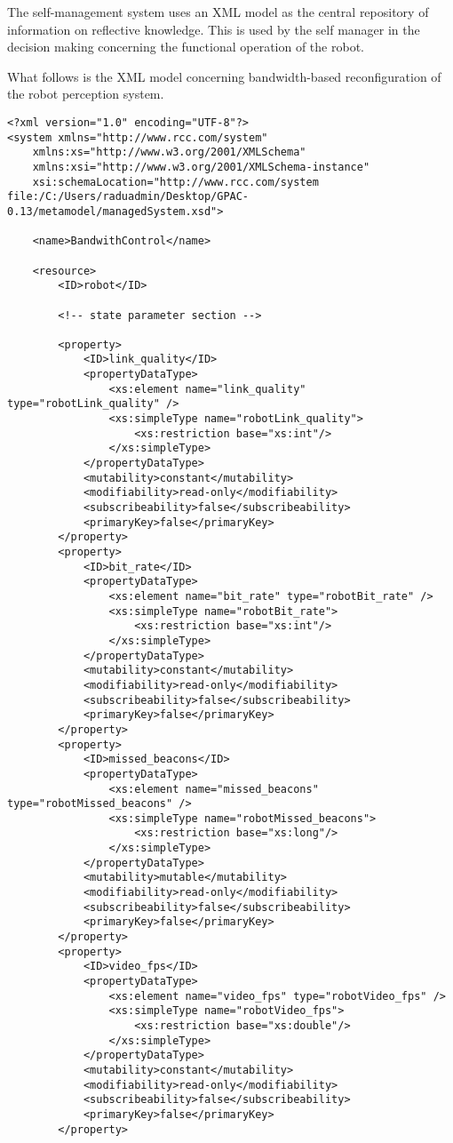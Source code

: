 \documentclass{aslreport}
\begin{document}
The self-management system uses an XML model as the central repository of information on reflective knowledge. This is used by the self manager in the decision making concerning the functional operation of the robot.

What follows is the XML model concerning bandwidth-based reconfiguration of the robot perception system.

{\small
\begin{verbatim}
<?xml version="1.0" encoding="UTF-8"?>
<system xmlns="http://www.rcc.com/system"
    xmlns:xs="http://www.w3.org/2001/XMLSchema"
    xmlns:xsi="http://www.w3.org/2001/XMLSchema-instance"
    xsi:schemaLocation="http://www.rcc.com/system file:/C:/Users/raduadmin/Desktop/GPAC-0.13/metamodel/managedSystem.xsd">
    
    <name>BandwithControl</name>
    
    <resource>
        <ID>robot</ID>

		<!-- state parameter section -->
		
        <property>
            <ID>link_quality</ID>
            <propertyDataType>
                <xs:element name="link_quality" type="robotLink_quality" />
                <xs:simpleType name="robotLink_quality">
                    <xs:restriction base="xs:int"/>
                </xs:simpleType>
            </propertyDataType>
            <mutability>constant</mutability>
            <modifiability>read-only</modifiability>
            <subscribeability>false</subscribeability>
            <primaryKey>false</primaryKey>
        </property>
        <property>
            <ID>bit_rate</ID>
            <propertyDataType>
                <xs:element name="bit_rate" type="robotBit_rate" />
                <xs:simpleType name="robotBit_rate">
                    <xs:restriction base="xs:int"/>
                </xs:simpleType>
            </propertyDataType>
            <mutability>constant</mutability>
            <modifiability>read-only</modifiability>
            <subscribeability>false</subscribeability>
            <primaryKey>false</primaryKey>
        </property>
        <property>
            <ID>missed_beacons</ID>
            <propertyDataType>
                <xs:element name="missed_beacons" type="robotMissed_beacons" />
                <xs:simpleType name="robotMissed_beacons">
                    <xs:restriction base="xs:long"/>
                </xs:simpleType>
            </propertyDataType>
            <mutability>mutable</mutability>
            <modifiability>read-only</modifiability>
            <subscribeability>false</subscribeability>
            <primaryKey>false</primaryKey>
        </property>
        <property>
            <ID>video_fps</ID>
            <propertyDataType>
                <xs:element name="video_fps" type="robotVideo_fps" />
                <xs:simpleType name="robotVideo_fps">
                    <xs:restriction base="xs:double"/>
                </xs:simpleType>
            </propertyDataType>
            <mutability>constant</mutability>
            <modifiability>read-only</modifiability>
            <subscribeability>false</subscribeability>
            <primaryKey>false</primaryKey>
        </property>


\end{verbatim}}
\end{document}
